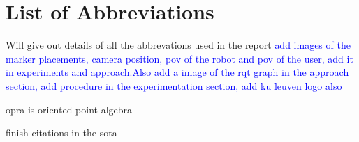 \chapter{List of Abbreviations}
Will give out details of all the abbrevations used in the report
\textcolor{blue}{add images of the marker placements, camera position, pov of the robot and pov of the user, add it in experiments and approach.Also add a image of the rqt graph in the approach section, add procedure in the experimentation section, add ku leuven logo also}

opra is oriented point algebra

finish citations in the sota
